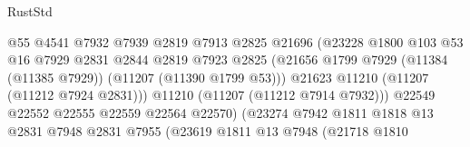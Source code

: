 \begin{lexlean}{RustStd}
\begin{coremodule}
                                            @55
                                            @4541
                                            @7932
                                            @7939
                                            @2819
                                            @7913
                                            @2825
                                            @21696
                                            (@23228
                                              @1800
                                              @103
                                              @53
                                              @16
                                              @7929
                                              @2831
                                              @2844
                                              @2819
                                              @7923
                                              @2825
                                              (@21656
                                                @1799
                                                @7929
                                                (@11384 (@11385 @7929))
                                                (@11207 (@11390 @1799 @53)))
                                              @21623
                                              @11210
                                              (@11207 (@11212 @7924 @2831)))
                                            @11210
                                            (@11207 (@11212 @7914 @7932)))
                                          @22549
                                          @22552
                                          @22555
                                          @22559
                                          @22564
                                          @22570)
                                        (@23274
                                          @7942
                                          @1811
                                          @1818
                                          @13
                                          @2831
                                          @7948
                                          @2831
                                          @7955
                                          (@23619
                                            @1811
                                            @13
                                            @7948
                                            (@21718
                                              @1810

\end{coremodule}
\end{lexlean}
